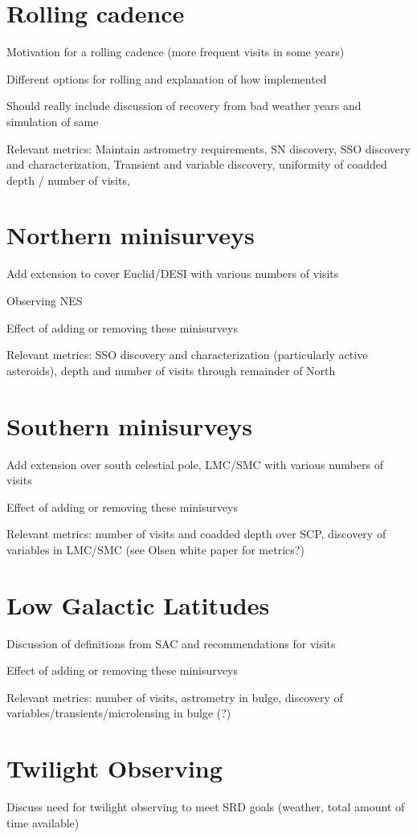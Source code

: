 \section{Rolling cadence}
Motivation for a rolling cadence (more frequent visits in some years)

Different options for rolling and explanation of how implemented

Should really include discussion of recovery from bad weather years and simulation of same

Relevant metrics: Maintain astrometry requirements, SN discovery, SSO discovery and characterization,  Transient and variable discovery, uniformity of coadded depth / number of visits, 

\section{Northern minisurveys}
Add extension to cover Euclid/DESI with various numbers of visits

Observing NES 

Effect of adding or removing these minisurveys

Relevant metrics: SSO discovery and characterization (particularly active asteroids), depth and number of visits through remainder of North

\section{Southern minisurveys}
Add extension over south celestial pole, LMC/SMC with various numbers of visits

Effect of adding or removing these minisurveys

Relevant metrics: number of visits and coadded depth over SCP, discovery of variables in LMC/SMC (see Olsen white paper for metrics?)

\section{Low Galactic Latitudes}
Discussion of definitions from SAC and recommendations for visits

Effect of adding or removing these minisurveys

Relevant metrics: number of visits, astrometry in bulge, discovery of variables/transients/microlensing in bulge (?)

\section{Twilight Observing}
Discuss need for twilight observing to meet SRD goals (weather, total amount of time available)

